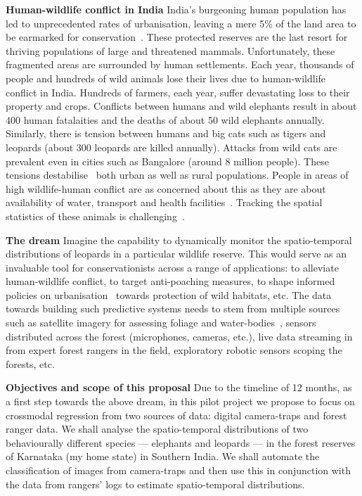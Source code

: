 \documentclass[a4paper,10pt,twocolumn]{article}
\newcommand{\hdg}[1] {\noindent \textbf{#1} }
\begin{document}
\hdg{Human-wildlife conflict in India} India's burgeoning human population has led to unprecedented rates of urbanisation, leaving a mere 5\% of the land area to be earmarked for conservation~\cite{indiacons}. These protected reserves are the last resort for thriving populations of large and threatened mammals. Unfortunately, these fragmented areas are surrounded by human settlements. Each year, thousands of people and hundreds of wild animals lose their lives due to human-wildlife conflict in India. Hundreds of farmers, each year, suffer devastating loss to their property and crops. Conflicts between humans and wild elephants result in about 400 human fatalaities and the deaths of about 50 wild elephants annually. Similarly, there is tension between humans and big cats such as tigers and leopards (about 300 leopards are killed annually). Attacks from wild cats are prevalent even in cities such as Bangalore (around 8 million people). These tensions destabilise~\cite{barua2013hidden} both urban as well as rural populations. People in areas of high wildlife-human conflict are as concerned about this as they are about availability of water, transport and health facilities~\cite{owen2013conservation}. Tracking the spatial statistics of these animals is challenging~\cite{troubletiger}.

\hdg{The dream}
Imagine the capability to dynamically monitor the spatio-temporal distributions of leopards in a particular wildlife reserve. This would serve as an invaluable tool for conservationists across a range of applications: to alleviate human-wildlife conflict, to target anti-poaching measures, to shape informed policies on urbanisation~\cite{gubbi2005new} towards protection of wild habitats, etc. The data towards building such predictive systems needs to stem from multiple sources~\cite{bliznyuk2014nonlinear} such as satellite imagery for assessing foliage and water-bodies~\cite{urthecast}, sensors distributed across the forest (microphones, cameras, etc.), live data streaming in from expert forest rangers in the field, exploratory robotic sensors scoping the forests, etc. 

\hdg{Objectives and scope of this proposal} 
Due to the timeline of 12 months,  as a first step towards the above dream, in this pilot project we propose to focus on crossmodal regression from two sources of data: digital camera-traps and forest ranger data. We shall analyse the spatio-temporal distributions of two behaviourally different species --- elephants and leopards --- in the forest reserves of Karnataka (my home state) in Southern India. We shall automate the classification of images from camera-traps and then use this in conjunction with the data from rangers' logs to estimate spatio-temporal distributions.
\end{document}
